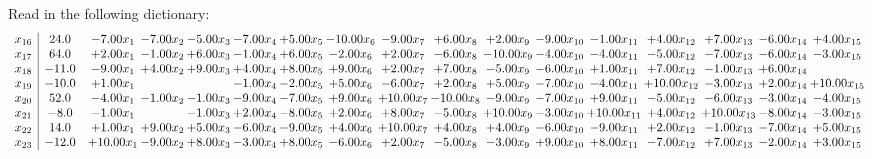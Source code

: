 \documentclass[9pt]{article}
\begin{document}
Read in the following dictionary:
\[\begin{array}{c| c c@{\hskip 2pt} c@{\hskip 2pt} c@{\hskip 2pt} c@{\hskip 2pt} c@{\hskip 2pt} c@{\hskip 2pt} c@{\hskip 2pt} c@{\hskip 2pt} c@{\hskip 2pt} c@{\hskip 2pt} c@{\hskip 2pt} c@{\hskip 2pt} c@{\hskip 2pt} c@{\hskip 2pt} c@{\hskip 2pt} }
 x_{16}   &  24.0 & -7.00 x_{1} & -7.00 x_{2} & -5.00 x_{3} & -7.00 x_{4} & +  5.00 x_{5} & -10.00 x_{6} & -9.00 x_{7} & +  6.00 x_{8} & +  2.00 x_{9} & -9.00 x_{10} & -1.00 x_{11} & +  4.00 x_{12} & +  7.00 x_{13} & -6.00 x_{14} & +  4.00 x_{15}\\
 x_{17}   &  64.0 & +  2.00 x_{1} & -1.00 x_{2} & +  6.00 x_{3} & -1.00 x_{4} & +  6.00 x_{5} & -2.00 x_{6} & +  2.00 x_{7} & -6.00 x_{8} & -10.00 x_{9} & -4.00 x_{10} & -4.00 x_{11} & -5.00 x_{12} & -7.00 x_{13} & -6.00 x_{14} & -3.00 x_{15}\\
 x_{18}   &  -11.0 & -9.00 x_{1} & +  4.00 x_{2} & +  9.00 x_{3} & +  4.00 x_{4} & +  8.00 x_{5} & +  9.00 x_{6} & +  2.00 x_{7} & +  7.00 x_{8} & -5.00 x_{9} & -6.00 x_{10} & +  1.00 x_{11} & +  7.00 x_{12} & -1.00 x_{13} & +  6.00 x_{14} &   \\
 x_{19}   &  -10.0 & +  1.00 x_{1} &    &   & -1.00 x_{4} & -2.00 x_{5} & +  5.00 x_{6} & -6.00 x_{7} & +  2.00 x_{8} & +  5.00 x_{9} & -7.00 x_{10} & -4.00 x_{11} & + 10.00 x_{12} & -3.00 x_{13} & +  2.00 x_{14} & + 10.00 x_{15}\\
 x_{20}   &  52.0 & -4.00 x_{1} & -1.00 x_{2} & -1.00 x_{3} & -9.00 x_{4} & -7.00 x_{5} & +  9.00 x_{6} & + 10.00 x_{7} & -10.00 x_{8} & -9.00 x_{9} & -7.00 x_{10} & +  9.00 x_{11} & -5.00 x_{12} & -6.00 x_{13} & -3.00 x_{14} & -4.00 x_{15}\\
 x_{21}   &  -8.0 & -1.00 x_{1} &   & -1.00 x_{3} & +  2.00 x_{4} & -8.00 x_{5} & +  2.00 x_{6} & +  8.00 x_{7} & -5.00 x_{8} & + 10.00 x_{9} & -3.00 x_{10} & + 10.00 x_{11} & +  4.00 x_{12} & + 10.00 x_{13} & -8.00 x_{14} & -3.00 x_{15}\\
 x_{22}   &  14.0 & +  1.00 x_{1} & +  9.00 x_{2} & +  5.00 x_{3} & -6.00 x_{4} & -9.00 x_{5} & +  4.00 x_{6} & + 10.00 x_{7} & +  4.00 x_{8} & +  4.00 x_{9} & -6.00 x_{10} & -9.00 x_{11} & +  2.00 x_{12} & -1.00 x_{13} & -7.00 x_{14} & +  5.00 x_{15}\\
 x_{23}   &  -12.0 & + 10.00 x_{1} & -9.00 x_{2} & +  8.00 x_{3} & -3.00 x_{4} & +  8.00 x_{5} & -6.00 x_{6} & +  2.00 x_{7} & -5.00 x_{8} & -3.00 x_{9} & +  9.00 x_{10} & +  8.00 x_{11} & -7.00 x_{12} & +  7.00 x_{13} & -2.00 x_{14} & +  3.00 x_{15}\\

\end{array}\]
\end{document}
